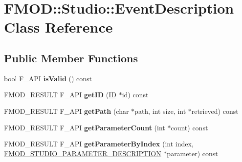 \hypertarget{class_f_m_o_d_1_1_studio_1_1_event_description}{\section{F\+M\+O\+D\+:\+:Studio\+:\+:Event\+Description Class Reference}
\label{class_f_m_o_d_1_1_studio_1_1_event_description}
}
\subsection*{Public Member Functions}
\begin{DoxyCompactItemize}
\item 
\hypertarget{class_f_m_o_d_1_1_studio_1_1_event_description_a72020ed403ae0b06360204b3b177006b}{bool F\+\_\+\+A\+P\+I {\bfseries is\+Valid} () const }\label{class_f_m_o_d_1_1_studio_1_1_event_description_a72020ed403ae0b06360204b3b177006b}

\item 
\hypertarget{class_f_m_o_d_1_1_studio_1_1_event_description_a522c46ea2d6c105db4447fe77f6c2408}{F\+M\+O\+D\+\_\+\+R\+E\+S\+U\+L\+T F\+\_\+\+A\+P\+I {\bfseries get\+I\+D} (\hyperlink{struct_f_m_o_d___g_u_i_d}{I\+D} $\ast$id) const }\label{class_f_m_o_d_1_1_studio_1_1_event_description_a522c46ea2d6c105db4447fe77f6c2408}

\item 
\hypertarget{class_f_m_o_d_1_1_studio_1_1_event_description_a2025a5aa3922c17934233fcebcbca54a}{F\+M\+O\+D\+\_\+\+R\+E\+S\+U\+L\+T F\+\_\+\+A\+P\+I {\bfseries get\+Path} (char $\ast$path, int size, int $\ast$retrieved) const }\label{class_f_m_o_d_1_1_studio_1_1_event_description_a2025a5aa3922c17934233fcebcbca54a}

\item 
\hypertarget{class_f_m_o_d_1_1_studio_1_1_event_description_a161dca6c8a54e93d1b8d557c899b1fab}{F\+M\+O\+D\+\_\+\+R\+E\+S\+U\+L\+T F\+\_\+\+A\+P\+I {\bfseries get\+Parameter\+Count} (int $\ast$count) const }\label{class_f_m_o_d_1_1_studio_1_1_event_description_a161dca6c8a54e93d1b8d557c899b1fab}

\item 
\hypertarget{class_f_m_o_d_1_1_studio_1_1_event_description_a841d1757556ad10e98aa524f8f5da494}{F\+M\+O\+D\+\_\+\+R\+E\+S\+U\+L\+T F\+\_\+\+A\+P\+I {\bfseries get\+Parameter\+By\+Index} (int index, \hyperlink{struct_f_m_o_d___s_t_u_d_i_o___p_a_r_a_m_e_t_e_r___d_e_s_c_r_i_p_t_i_o_n}{F\+M\+O\+D\+\_\+\+S\+T\+U\+D\+I\+O\+\_\+\+P\+A\+R\+A\+M\+E\+T\+E\+R\+\_\+\+D\+E\+S\+C\+R\+I\+P\+T\+I\+O\+N} $\ast$parameter) const }\label{class_f_m_o_d_1_1_studio_1_1_event_description_a841d1757556ad10e98aa524f8f5da494}


\end{DoxyCompactItemize}
